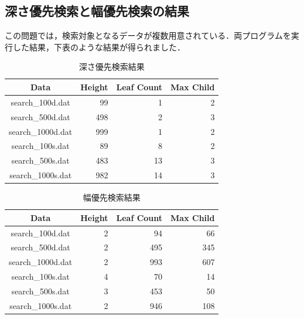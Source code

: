 \documentclass[a4j, titlepage]{jarticle}
\begin{document}
    \subsection{深さ優先検索と幅優先検索の結果}
    この問題では，検索対象となるデータが複数用意されている．両プログラムを実行した結果，下表のような結果が得られました．
    \begin{longtable}[c]{|c|r|r|r|}
        \caption{深さ優先検索結果}
        \label{tab:dfsres}\\
        \hline
        \rowcolor[HTML]{C0C0C0} 
        \cellcolor[HTML]{C0C0C0}Data & \multicolumn{1}{c|}{\cellcolor[HTML]{C0C0C0}Height} & \multicolumn{1}{c|}{\cellcolor[HTML]{C0C0C0}Leaf Count} & \multicolumn{1}{c|}{\cellcolor[HTML]{C0C0C0}Max Child} \\ \hline
        \endfirsthead
        \endhead
        search\_100d.dat      & 99         & 1      & 2   \\ \hline
        search\_500d.dat      & 498        & 2      & 3   \\ \hline
        search\_1000d.dat     & 999        & 1      & 2   \\ \hline
        search\_100s.dat      & 89         & 8      & 2   \\ \hline
        search\_500s.dat      & 483        & 13     & 3   \\ \hline
        search\_1000s.dat     & 982        & 14     & 3   \\ \hline
    \end{longtable}
    \begin{longtable}[c]{|c|r|r|r|}
        \caption{幅優先検索結果}
        \label{tab:bfsres}\\
        \hline
        \rowcolor[HTML]{C0C0C0} 
        \cellcolor[HTML]{C0C0C0}Data & \multicolumn{1}{c|}{\cellcolor[HTML]{C0C0C0}Height} & \multicolumn{1}{c|}{\cellcolor[HTML]{C0C0C0}Leaf Count} & \multicolumn{1}{c|}{\cellcolor[HTML]{C0C0C0}Max Child} \\ \hline
        \endfirsthead
        \endhead
        search\_100d.dat      & 2          & 94      & 66   \\ \hline
        search\_500d.dat      & 2        & 495      & 345   \\ \hline
        search\_1000d.dat     & 2        & 993      & 607   \\ \hline
        search\_100s.dat      & 4         & 70      & 14   \\ \hline
        search\_500s.dat      & 3        & 453     & 50   \\ \hline
        search\_1000s.dat     & 2        & 946     & 108   \\ \hline
    \end{longtable}
\end{document}
